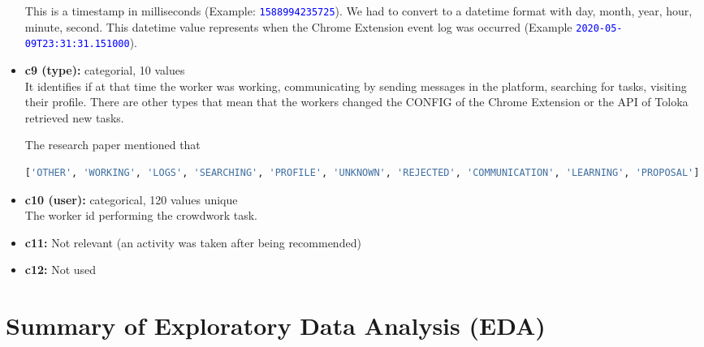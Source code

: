 \documentclass[11pt]{article}
\newcommand{\codeword}[1]{\texttt{\textcolor{blue}{#1}}}
\begin{document}
\begin{itemize}
    This is a timestamp in milliseconds (Example: \codeword{1588994235725}). We had to convert to a datetime format with day, month, year, hour, minute, second. This datetime value represents when the Chrome Extension \cite{toloka-web-extension-github} event log was occurred (Example \codeword{2020-05-09T23:31:31.151000}).
    \item \textbf{c9 (type):} categorial, 10 values \\
    It identifies if at that time the worker was working, communicating by sending messages in the platform, searching for tasks, visiting their profile. There are other types that mean that the workers changed the CONFIG of the Chrome Extension \cite{toloka-web-extension-github} or the API of Toloka retrieved new tasks.

    The research paper mentioned that 
    \begin{lstlisting}[language=Python, caption=Chrome Plugin: 'type' value.]
['OTHER', 'WORKING', 'LOGS', 'SEARCHING', 'PROFILE', 'UNKNOWN', 'REJECTED', 'COMMUNICATION', 'LEARNING', 'PROPOSAL']
\end{lstlisting}
    \item \textbf{c10 (user):} categorical, 120 values unique \\
    The worker id performing the crowdwork task.
    \item \textbf{c11:} Not relevant (an activity was taken after being recommended)
    \item \textbf{c12:} Not used
\end{itemize}

\section{Summary of Exploratory Data Analysis (EDA)}
\end{document}
